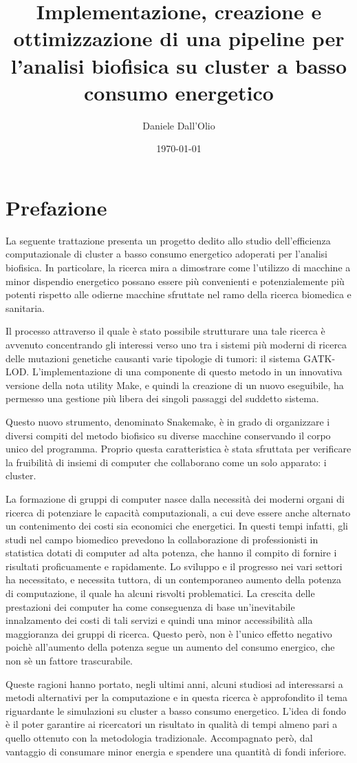 \documentclass[12pt, a4paper]{report}
\title{Implementazione, creazione e ottimizzazione di una pipeline per l'analisi biofisica su cluster a basso consumo energetico}
\author{Daniele Dall'Olio}
\date{\today}
\begin{document}
\section*{Prefazione}
La seguente trattazione presenta un progetto dedito allo studio dell'efficienza computazionale di cluster a basso consumo energetico adoperati per l'analisi biofisica.
In particolare, la ricerca mira a dimostrare come l'utilizzo di macchine a minor dispendio energetico possano essere più convenienti e potenzialemente più potenti rispetto alle odierne macchine sfruttate nel ramo della ricerca biomedica e sanitaria.


Il processo attraverso il quale è stato possibile strutturare una tale ricerca è avvenuto concentrando gli interessi verso uno tra i sistemi più moderni di ricerca delle mutazioni genetiche causanti varie tipologie di tumori: il sistema GATK-LOD.
L'implementazione di una componente di questo metodo in un innovativa versione della nota utility Make, e quindi la creazione di un nuovo eseguibile, ha permesso una gestione più libera dei singoli passaggi del suddetto sistema.

Questo nuovo strumento, denominato Snakemake, è in grado di organizzare i diversi compiti del metodo biofisico su diverse macchine conservando il corpo unico del programma.
Proprio questa caratteristica è stata sfruttata per verificare la fruibilità di insiemi di computer che collaborano come un solo apparato: i cluster.

La formazione di gruppi di computer nasce dalla necessità dei moderni organi di ricerca di potenziare le capacità computazionali, a cui deve essere anche alternato un contenimento dei costi sia economici che energetici.
In questi tempi infatti, gli studi nel campo biomedico prevedono la collaborazione di professionisti in statistica dotati di computer ad alta potenza, che hanno il compito di fornire i risultati proficuamente e rapidamente.
Lo sviluppo e il progresso nei vari settori ha necessitato, e necessita tuttora, di un contemporaneo aumento della potenza di computazione, il quale ha alcuni risvolti problematici.
La crescita delle prestazioni dei computer ha come conseguenza di base un'inevitabile innalzamento dei costi di tali servizi e quindi una minor accessibilità alla maggioranza dei gruppi di ricerca.
Questo però, non è l'unico effetto negativo poichè all'aumento della potenza segue un aumento del consumo energico, che non sè un fattore trascurabile.

Queste ragioni hanno portato, negli ultimi anni, alcuni studiosi ad interessarsi a metodi alternativi per la computazione e in questa ricerca è approfondito il tema riguardante le simulazioni su cluster a basso consumo energetico.
L'idea di fondo è il poter garantire ai ricercatori un risultato in qualità di tempi almeno pari a quello ottenuto con la metodologia tradizionale.
Accompagnato però, dal vantaggio di consumare minor energia e spendere una quantità di fondi inferiore.
\end{document}
